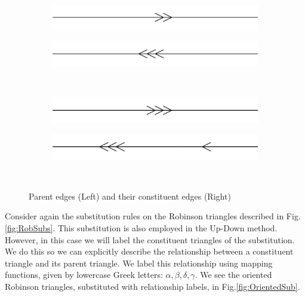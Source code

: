 \documentclass[
  oneside,
  11pt, a4paper,
  footinclude=true,
  headinclude=true,
  cleardoublepage=empty
]{scrbook}
\begin{document}
\begin{figure}[H]
        \begin{subfigure}[t]{0.4\textwidth}
                \includegraphics[width=\textwidth]{a3}
        \end{subfigure}\hfill
        \begin{subfigure}[t]{0.4\textwidth}
                \includegraphics[width=\textwidth]{a3inflate}
        \end{subfigure}\\                           
        
        \begin{subfigure}[t]{0.4\textwidth}
                \includegraphics[width=\textwidth]{a4}
        \end{subfigure}\hfill
        \begin{subfigure}[t]{0.4\textwidth}
                \includegraphics[width=\textwidth]{a4inflate}
        \end{subfigure}\\   
        \caption{Parent edges (Left) and their constituent edges (Right)}     
        \label{fig:EdgeRules}
\end{figure} 


\pagebreak
Consider again the substitution rules on the Robinson triangles described in Fig.\ref{fig:RobSubs}. This substitution is also employed in the Up-Down method. However, in this case we will label the constituent triangles of the substitution. We do this so we can explicitly describe the relationship between a constituent triangle and its parent triangle. We label this relationship using mapping functions, given by lowercase Greek letters: $\alpha, \beta, \delta, \gamma$. We see the oriented Robinson triangles, substituted with relationship labels, in Fig.\ref{fig:OrientedSub}.
\end{document}
